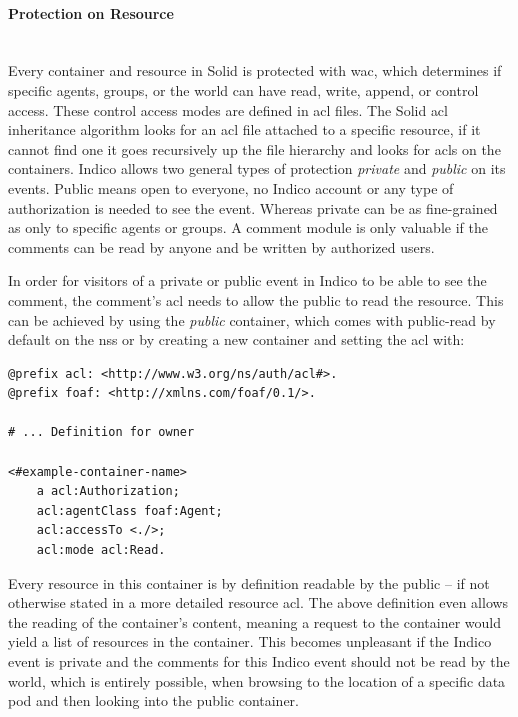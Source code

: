 \paragraph{Protection on Resource}\label{protection-on-resource}\mbox{}\\

Every container and resource in Solid is protected with \gls{wac}, which determines if specific agents, groups, or the world can have read, write, append, or control access. These control access modes are defined in \gls{acl} files. The Solid \gls{acl} inheritance algorithm looks for an \gls{acl} file attached to a specific resource, if it cannot find one it goes recursively up the file hierarchy and looks for \glspl{acl} on the containers.
Indico allows two general types of protection \textit{private} and \textit{public} on its events. Public means open to everyone, no Indico account or any type of authorization is needed to see the event. Whereas private can be as fine-grained as only to specific agents or groups. A comment module is only valuable if the comments can be read by anyone and be written by authorized users.

In order for visitors of a private or public event in Indico to be able to see the comment, the comment’s \gls{acl} needs to allow the public to read the resource. This can be achieved by using the \textit{public} container, which comes with public-read by default on the \gls{nss} or by creating a new container and setting the \gls{acl} with:

\begin{lstlisting}[language=Other,columns=fullflexible, caption={TODO: Label caption}, label={lst:1}]
@prefix acl: <http://www.w3.org/ns/auth/acl#>.
@prefix foaf: <http://xmlns.com/foaf/0.1/>.

# ... Definition for owner

<#example-container-name>
    a acl:Authorization;
    acl:agentClass foaf:Agent;
    acl:accessTo <./>;
    acl:mode acl:Read.
\end{lstlisting}

Every resource in this container is by definition readable by the public -- if not otherwise stated in a more detailed resource \gls{acl}. The above definition even allows the reading of the container’s content, meaning a request to the container would yield a list of resources in the container. This becomes unpleasant if the Indico event is private and the comments for this Indico event should not be read by the world, which is entirely possible, when browsing to the location of a specific data pod and then looking into the public container.

